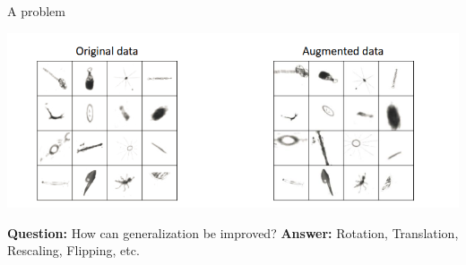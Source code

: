 \documentclass[default, aspectratio=169]{beamer}
\begin{document}
	\begin{frame}{A problem}
		
		\centering
		\includegraphics[keepaspectratio, scale=0.6]{pic/training7.png}
		\smallskip
		
		
		
		\begin{flushleft}
			\textbf{Question:} How can generalization be improved?
			\bigskip
			\textbf{Answer:} Rotation, Translation, Rescaling, Flipping, etc.
			
		\end{flushleft}
		
	\end{frame}
\end{document}
